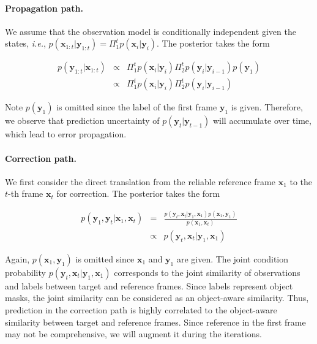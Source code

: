 \documentclass[letterpaper]{article} \usepackage{aaai22}  \usepackage{times}  \usepackage{helvet}  \usepackage{courier}  \usepackage[hyphens]{url}  \usepackage{graphicx} \urlstyle{rm} \def\UrlFont{\rm}  \usepackage{natbib}  \usepackage{caption} \DeclareCaptionStyle{ruled}{labelfont=normalfont,labelsep=colon,strut=off} \frenchspacing  \setlength{\pdfpagewidth}{8.5in}  \setlength{\pdfpageheight}{11in}  \usepackage{algorithm}
\def\ie{\textit{i.e.}}
\begin{document}
\paragraph{Propagation path.}
We assume that the observation model is conditionally independent given the states, \ie, $p(\mathbf{x}_{1:t}|\mathbf{y}_{1:t}) = \Pi_{1}^t p(\mathbf{x}_{i}|\mathbf{y}_{i})$. The posterior takes the form
\begin{small}
\begin{eqnarray}
\label{eq:prob_propation}
p(\mathbf{y}_{1:t} | \mathbf{x}_{1:t}) & \propto & \Pi_{1}^t p(\mathbf{x}_i|\mathbf{y}_i) \Pi_{2}^t p(\mathbf{y}_i|\mathbf{y}_{i-1}) p(\mathbf{y}_1) \nonumber \\ & \propto & \Pi_{1}^t p(\mathbf{x}_i|\mathbf{y}_i) \Pi_{2}^t p(\mathbf{y}_i|\mathbf{y}_{i-1})
\end{eqnarray}
\end{small}
Note $p(\mathbf{y}_1)$ is omitted since the label of the first frame $\mathbf{y}_1$ is given.
Therefore, we observe that prediction uncertainty of $p(\mathbf{y}_t|\mathbf{y}_{t-1})$ will accumulate over time, which lead to error propagation.

\paragraph{Correction path.}
We first consider the direct translation from the reliable reference frame $\mathbf{x}_1$ to the $t$-th frame $\mathbf{x}_t$ for correction. The posterior takes the form
\begin{small}
\begin{eqnarray}
\label{eq:prob_match}
p(\mathbf{y}_1, \mathbf{y}_t | \mathbf{x}_{1}, \mathbf{x}_{t}) & = & \frac{p(\mathbf{y}_t, \mathbf{x}_t | \mathbf{y}_{1}, \mathbf{x}_{1}) p(\mathbf{x}_1, \mathbf{y}_1)}{p(\mathbf{x}_1, \mathbf{x}_t)} \nonumber \\ & \propto & p(\mathbf{y}_t, \mathbf{x}_t | \mathbf{y}_{1}, \mathbf{x}_{1})
\end{eqnarray}
\end{small}
Again, $p(\mathbf{x}_1, \mathbf{y}_1)$ is omitted since $\mathbf{x}_1$ and $\mathbf{y}_1$ are given. The joint condition probability $p(\mathbf{y}_t, \mathbf{x}_t | \mathbf{y}_{1}, \mathbf{x}_{1})$ corresponds to the joint similarity of observations and labels between target and reference frames. Since labels represent object masks, the joint similarity can be considered as an object-aware similarity. Thus, prediction in the correction path is highly correlated to the object-aware similarity between target and reference frames. Since reference in the first frame may not be comprehensive, we will augment it during the iterations.
\end{document}
